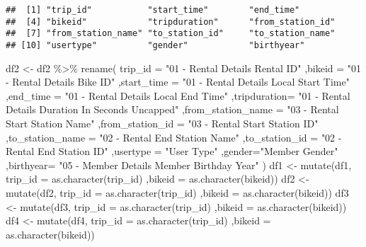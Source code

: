 \documentclass[
]{article}
\newenvironment{Shaded}{\begin{snugshade}}{\end{snugshade}}
\newcommand{\AttributeTok}[1]{\textcolor[rgb]{0.77,0.63,0.00}{#1}}
\newcommand{\FunctionTok}[1]{\textcolor[rgb]{0.00,0.00,0.00}{#1}}
\newcommand{\NormalTok}[1]{#1}
\newcommand{\OtherTok}[1]{\textcolor[rgb]{0.56,0.35,0.01}{#1}}
\newcommand{\SpecialCharTok}[1]{\textcolor[rgb]{0.00,0.00,0.00}{#1}}
\newcommand{\StringTok}[1]{\textcolor[rgb]{0.31,0.60,0.02}{#1}}
\begin{document}
\begin{verbatim}
##  [1] "trip_id"           "start_time"        "end_time"         
##  [4] "bikeid"            "tripduration"      "from_station_id"  
##  [7] "from_station_name" "to_station_id"     "to_station_name"  
## [10] "usertype"          "gender"            "birthyear"
\end{verbatim}

\begin{Shaded}
\begin{Highlighting}[]
\NormalTok{df2 }\OtherTok{\textless{}{-}}\NormalTok{ df2 }\SpecialCharTok{\%\textgreater{}\%} 
  \FunctionTok{rename}\NormalTok{(}
    \AttributeTok{trip\_id =} \StringTok{"01 {-} Rental Details Rental ID"}
\NormalTok{          ,}\AttributeTok{bikeid =} \StringTok{"01 {-} Rental Details Bike ID"} 
\NormalTok{          ,}\AttributeTok{start\_time =} \StringTok{"01 {-} Rental Details Local Start Time"}  
\NormalTok{          ,}\AttributeTok{end\_time =} \StringTok{"01 {-} Rental Details Local End Time"}  
\NormalTok{          ,}\AttributeTok{tripduration=}  \StringTok{"01 {-} Rental Details Duration In Seconds Uncapped"}
\NormalTok{          ,}\AttributeTok{from\_station\_name =} \StringTok{"03 {-} Rental Start Station Name"} 
\NormalTok{          ,}\AttributeTok{from\_station\_id =} \StringTok{"03 {-} Rental Start Station ID"}
\NormalTok{          ,}\AttributeTok{to\_station\_name =} \StringTok{"02 {-} Rental End Station Name"} 
\NormalTok{          ,}\AttributeTok{to\_station\_id =} \StringTok{"02 {-} Rental End Station ID"}
\NormalTok{          ,}\AttributeTok{usertype =} \StringTok{"User Type"}
\NormalTok{          ,}\AttributeTok{gender=}\StringTok{"Member Gender"}
\NormalTok{          ,}\AttributeTok{birthyear=} \StringTok{"05 {-} Member Details Member Birthday Year"}
\NormalTok{          )}
\NormalTok{df1 }\OtherTok{\textless{}{-}}  \FunctionTok{mutate}\NormalTok{(df1, }\AttributeTok{trip\_id =} \FunctionTok{as.character}\NormalTok{(trip\_id)}
\NormalTok{                   ,}\AttributeTok{bikeid =} \FunctionTok{as.character}\NormalTok{(bikeid))}
\NormalTok{df2 }\OtherTok{\textless{}{-}}  \FunctionTok{mutate}\NormalTok{(df2, }\AttributeTok{trip\_id =} \FunctionTok{as.character}\NormalTok{(trip\_id)}
\NormalTok{               ,}\AttributeTok{bikeid =} \FunctionTok{as.character}\NormalTok{(bikeid))}
\NormalTok{df3 }\OtherTok{\textless{}{-}}  \FunctionTok{mutate}\NormalTok{(df3, }\AttributeTok{trip\_id =} \FunctionTok{as.character}\NormalTok{(trip\_id)}
\NormalTok{               ,}\AttributeTok{bikeid =} \FunctionTok{as.character}\NormalTok{(bikeid))}
\NormalTok{df4 }\OtherTok{\textless{}{-}}  \FunctionTok{mutate}\NormalTok{(df4, }\AttributeTok{trip\_id =} \FunctionTok{as.character}\NormalTok{(trip\_id)}
\NormalTok{               ,}\AttributeTok{bikeid =} \FunctionTok{as.character}\NormalTok{(bikeid))}
\end{Highlighting}
\end{Shaded}
\end{document}
